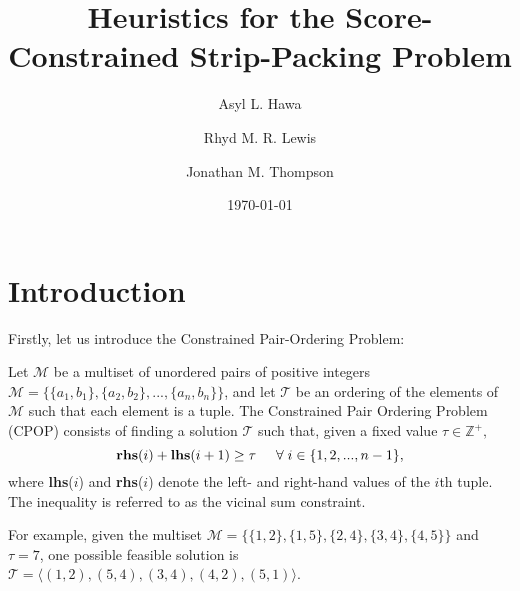 \documentclass[oribibl]{llncs}
\title{Heuristics for the Score-Constrained Strip-Packing Problem}
\author{Asyl L. Hawa \and Rhyd M. R. Lewis \and Jonathan M. Thompson}
\institute{School of Mathematics, Cardiff University, Senghennydd Road, Cardiff, UK, CF24 4AG}
\date{\today}
\begin{document}
\maketitle

\begin{abstract}
	
\end{abstract}

\section{Introduction}
\label{sec:intro}

Firstly, let us introduce the Constrained Pair-Ordering Problem:

\begin{definition}
	\label{defn:cpop}
	Let $\mathcal{M}$ be a multiset of unordered pairs of positive integers $\mathcal{M} = \{\{a_1, b_1\}, \{a_2,b_2\},...,\{a_n,b_n\}\}$, and let $\mathcal{T}$ be an ordering of the elements of $\mathcal{M}$ such that each element is a tuple. The Constrained Pair Ordering Problem (CPOP) consists of finding a solution $\mathcal{T}$ such that, given a fixed value $\tau \in \mathbb{Z}^{+},$
	\begin{equation}
		\label{eqn:cpop}
		\textup{\textbf{rhs}}(i) + \textup{\textbf{lhs}}(i+1) \geq \tau \hspace{5mm} \forall \hspace{1mm} i \in \{1,2,..., n-1\},
	\end{equation}
	where \textup{\textbf{lhs}($i$)} and \textup{\textbf{rhs}($i$)} denote the left- and right-hand values of the $i$th tuple. The inequality is referred to as the vicinal sum constraint.
\end{definition}

For example, given the multiset $\mathcal{M} = \{\{1,2\}, \{1,5\}, \{2,4\}, \{3,4\}, \{4,5\}\}$ and $\tau = 7$, one possible feasible solution is $\mathcal{T} = \langle(1,2), (5,4), (3,4), (4,2), (5,1) \rangle$.
\end{document}
